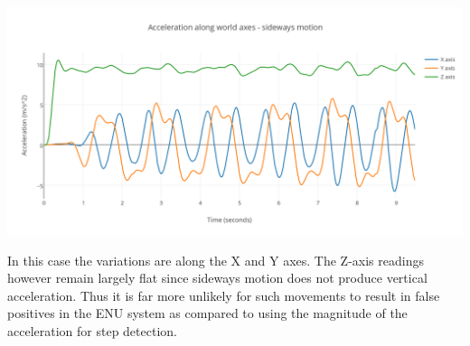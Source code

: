 \documentclass[12pt,a4paper,notitlepage]{report}
\begin{document}
\begin{center}
\includegraphics[scale=0.9]{images/sidewaysMotionVerticalAcceleration.png}
\label{fig:sidewaysMotionVerticalAcceleration}
\end{center}
In this case the variations are along the X and Y axes. The Z-axis readings however remain largely flat since sideways motion does not produce vertical acceleration. Thus it is far more unlikely for such movements to result in false positives in the ENU system as compared to using the magnitude of the acceleration for step detection. 


\nocite{*}



\end{document}
